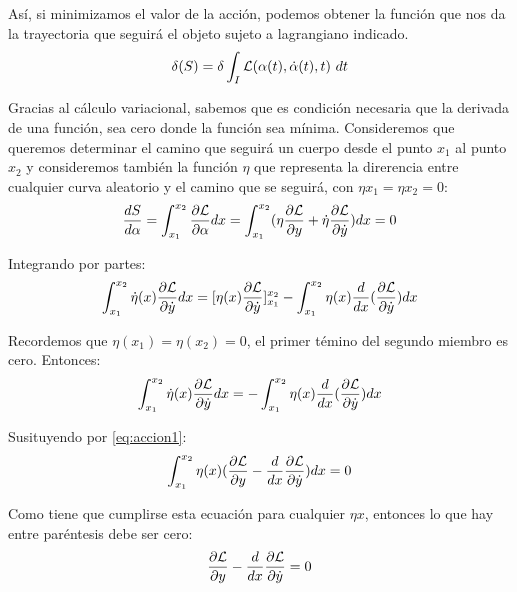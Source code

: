Así, si minimizamos el valor de la acción, podemos obtener la función que nos da la trayectoria que seguirá el objeto sujeto a lagrangiano indicado.
\begin{equation}
    \delta(S) = \delta \int_{I}\mathcal{L}(\alpha(t), \dot{\alpha}(t), t)\ dt
\end{equation}

Gracias al cálculo variacional, sabemos que es condición necesaria que la derivada de una función, sea cero donde la función sea mínima. Consideremos que queremos determinar el camino que seguirá un cuerpo desde el punto $x_1$ al punto $x_2$ y consideremos también la función $\eta$ que representa la direrencia entre cualquier curva aleatorio y el camino que se seguirá, con $\eta{x_1} = \eta{x_2} = 0$:
\begin{equation}
    \label{eq:accion1}
    \frac{dS}{d\alpha} = \int_{x_1}^{x_2}\frac{\partial\mathcal{L}}{\partial\alpha}dx = \int_{x_1}^{x_2}(\eta\frac{\partial\mathcal{L}}{\partial y} + \dot{\eta}\frac{\partial\mathcal{L}}{\partial\dot{y}})dx = 0
\end{equation}

Integrando por partes:
\begin{equation}
    \int_{x_1}^{x_2}\dot{\eta}(x)\frac{\partial\mathcal{L}}{\partial\dot{y}}dx = [\eta(x)\frac{\partial\mathcal{L}}{\partial\dot{y}}]_{x_1}^{x_2} - \int_{x_1}^{x_2}\eta(x)\frac{d}{dx}(\frac{\partial\mathcal{L}}{\partial\dot{y}})dx
\end{equation}

Recordemos que $\eta(x_1) = \eta(x_2) = 0$, el primer témino del segundo miembro es cero. Entonces:
\begin{equation}
    \int_{x_1}^{x_2}\dot{\eta}(x)\frac{\partial\mathcal{L}}{\partial\dot{y}}dx = - \int_{x_1}^{x_2}\eta(x)\frac{d}{dx}(\frac{\partial\mathcal{L}}{\partial\dot{y}})dx
\end{equation}

Susituyendo por \eqref{eq:accion1}:
\begin{equation}
    \int_{x_1}^{x_2}\eta(x)(\frac{\partial\mathcal{L}}{\partial y} - \frac{d}{dx}\frac{\partial\mathcal{L}}{\partial\dot{y}})dx = 0
\end{equation}

Como tiene que cumplirse esta ecuación para cualquier $\eta{x}$, entonces lo que hay entre paréntesis debe ser cero:
\begin{equation}
    \frac{\partial\mathcal{L}}{\partial y} - \frac{d}{dx}\frac{\partial\mathcal{L}}{\partial\dot{y}} = 0
\end{equation}

